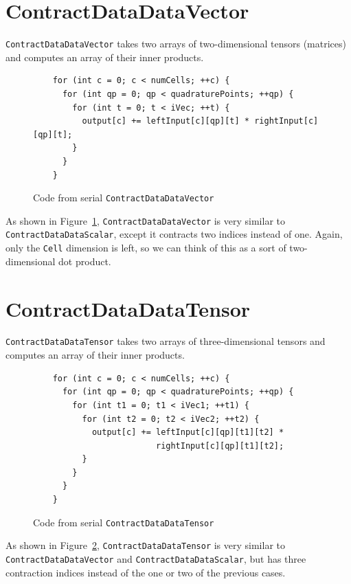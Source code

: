 \section{ContractDataDataVector}
\texttt{ContractDataDataVector} takes two arrays of two-dimensional tensors
(matrices) and computes an array of their inner products.
\begin{figure}[ht]
    \begin{lstlisting}
    for (int c = 0; c < numCells; ++c) {
      for (int qp = 0; qp < quadraturePoints; ++qp) {
        for (int t = 0; t < iVec; ++t) {
          output[c] += leftInput[c][qp][t] * rightInput[c][qp][t];
        }
      }
    }
    \end{lstlisting}
\caption{Code from serial \texttt{ContractDataDataVector}
\label{lst:ContractDataDataVectorSerial}} 
\end{figure}

As shown in Figure~\ref{lst:ContractDataDataVectorSerial},
\texttt{ContractDataDataVector} is very similar to
\texttt{ContractDataDataScalar}, except it contracts two indices instead of
one. Again, only the \texttt{Cell} dimension is left, so we can think of this as a
sort of two-dimensional dot product.

\section{ContractDataDataTensor}\label{section:ContractDataDataTensor}
\texttt{ContractDataDataTensor} takes two arrays of three-dimensional tensors
and computes an array of their inner products.

\begin{figure}[ht]
    \begin{lstlisting}
    for (int c = 0; c < numCells; ++c) {
      for (int qp = 0; qp < quadraturePoints; ++qp) {
        for (int t1 = 0; t1 < iVec1; ++t1) {
          for (int t2 = 0; t2 < iVec2; ++t2) {
            output[c] += leftInput[c][qp][t1][t2] * 
                         rightInput[c][qp][t1][t2];
          }
        }
      }
    }
    \end{lstlisting}
\caption{Code from serial \texttt{ContractDataDataTensor}
\label{lst:ContractDataDataTensorSerial}} 
\end{figure}

As shown in Figure~\ref{lst:ContractDataDataTensorSerial},
\texttt{ContractDataDataTensor} is very similar to\\
\texttt{ContractDataDataVector} and \texttt{ContractDataDataScalar}, but has
three contraction indices instead of the one or two of the previous cases.

